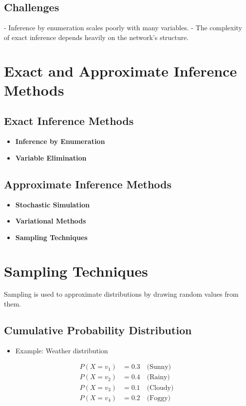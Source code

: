 \subsection*{Challenges}
- Inference by enumeration scales poorly with many variables.
- The complexity of exact inference depends heavily on the network’s structure.

\section{Exact and Approximate Inference Methods}

\subsection*{Exact Inference Methods}
\begin{itemize}
    \item \textbf{Inference by Enumeration}
    \item \textbf{Variable Elimination}
\end{itemize}

\subsection*{Approximate Inference Methods}
\begin{itemize}
    \item \textbf{Stochastic Simulation}
    \item \textbf{Variational Methods}
    \item \textbf{Sampling Techniques}
\end{itemize}

\section{Sampling Techniques}

Sampling is used to approximate distributions by drawing random values from them.

\subsection*{Cumulative Probability Distribution}

\begin{itemize}
    \item Example: Weather distribution
\end{itemize}

\[
\begin{aligned}
P(X = v_1) &= 0.3 \quad \text{(Sunny)} \\
P(X = v_2) &= 0.4 \quad \text{(Rainy)} \\
P(X = v_3) &= 0.1 \quad \text{(Cloudy)} \\
P(X = v_4) &= 0.2 \quad \text{(Foggy)} \\
\end{aligned}
\]

